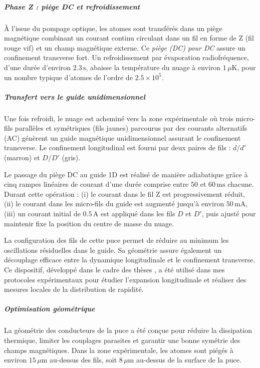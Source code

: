 \subparagraph{Phase Z : piège DC et refroidissement}
À l’issue du pompage optique, les atomes sont transférés dans un piège magnétique combinant un courant continu circulant dans un fil en forme de Z (fil rouge vif) et un champ magnétique externe. Ce \emph{piège (\acrshort{DC}) pour \acrlong{DC}} assure un confinement transverse fort. Un refroidissement par évaporation radiofréquence, d’une durée d’environ \(2.3\,\mathrm{s}\), abaisse la température du nuage à environ \(1\,\mu\mathrm{K}\), pour un nombre typique d’atomes de l’ordre de \(2.5\times 10^5\).


\subparagraph{Transfert vers le guide unidimensionnel}
Une fois refroidi, le nuage est acheminé vers la zone expérimentale où trois micro-fils parallèles et symétriques (fils jaunes) parcourus par des courants alternatifs (\gls{AC}) génèrent un guide magnétique unidimensionnel assurant le confinement transverse. Le confinement longitudinal est fourni par deux paires de fils : $d/d'$ (marron) et $D/D'$ (gris).

\medskip

Le passage du piège \gls{DC} au guide 1D est réalisé de manière adiabatique grâce à cinq rampes linéaires de courant d’une durée comprise entre \(50\) et \(60\,\mathrm{ms}\) chacune. Durant cette opération :  
(i) le courant dans le fil Z est progressivement réduit,  
(ii) le courant dans les micro-fils du guide est augmenté jusqu’à environ \(50\,\mathrm{mA}\),  
(iii) un courant initial de \(0.5\,\mathrm{A}\) est appliqué dans les fils $D$ et $D'$, puis ajusté pour maintenir fixe la position du centre de masse du nuage.  

\medskip


La configuration des fils de cette puce permet de réduire au minimum les oscillations résiduelles dans le guide. Sa géométrie assure également un découplage efficace entre la dynamique longitudinale et le confinement transverse. Ce dispositif, développé dans le cadre des thèses \cite{Fang2014,schem2019,L.Dubois2024}, a été utilisé dans mes protocoles expérimentaux pour étudier l’expansion longitudinale et réaliser des mesures locales de la distribution de rapidité.


\subparagraph{Optimisation géométrique}
La géométrie des conducteurs de la puce a été conçue pour réduire la dissipation thermique, limiter les couplages parasites et garantir une bonne symétrie des champs magnétiques. Dans la zone expérimentale, les atomes sont piégés à environ \(15\,\mu\mathrm{m}\) au-dessus des fils, soit \(8\,\mu\mathrm{m}\) au-dessus de la surface de la puce.


